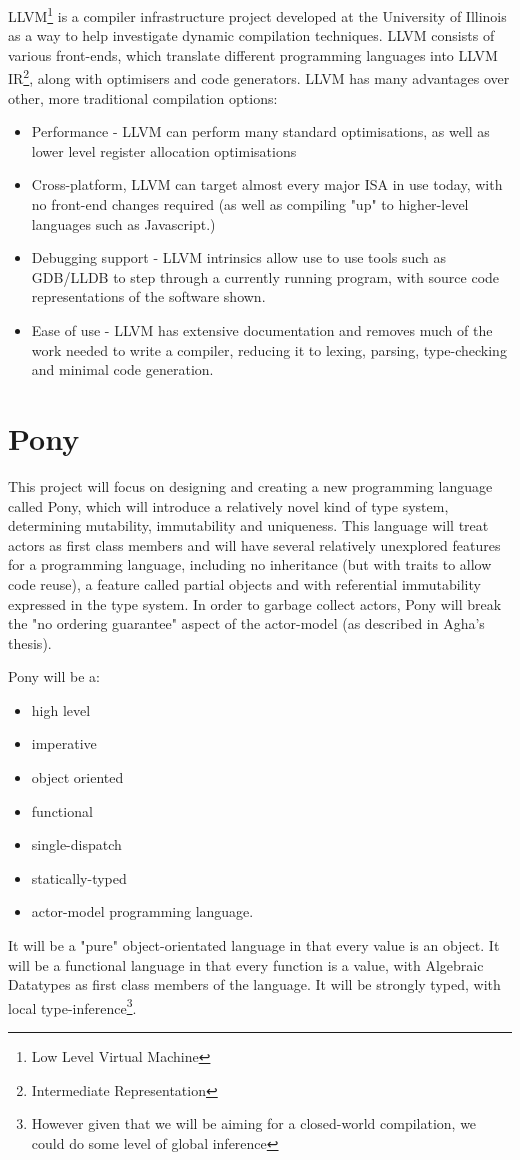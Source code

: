 \documentclass[pdftex,12pt,a4paper]{article}
\begin{document}
LLVM\footnote{Low Level Virtual Machine} is a compiler infrastructure project developed at the University of Illinois as a way to help investigate dynamic compilation techniques\cite{Lattner:MSThesis02}.
LLVM consists of various front-ends, which translate different programming languages into LLVM IR\footnote{Intermediate Representation}, along with optimisers and code generators.
LLVM has many advantages over other, more traditional compilation options:
\begin{itemize}[noitemsep]
\item Performance - LLVM can perform many standard optimisations, as well as lower level register allocation optimisations
\item Cross-platform, LLVM can target almost every major ISA in use today\cite{llvm-svn}, with no front-end changes required (as well as compiling "up" to higher-level languages such as Javascript.) 
\item Debugging support - LLVM intrinsics allow use to use tools such as GDB/LLDB to step through a currently running program, with source code representations of the software shown.
\item Ease of use - LLVM has extensive documentation and removes much of the work needed to write a compiler, reducing it to lexing, parsing, type-checking and minimal code generation.
\end{itemize}

\newpage
\section{Pony}

This project will focus on designing and creating a new programming language called Pony, which will introduce a relatively novel kind of type system, determining mutability, immutability and uniqueness.
This language will treat actors as first class members and will have several relatively unexplored features for a programming language, including no inheritance (but with traits to allow code reuse), a feature called partial objects and with referential immutability expressed in the type system. 
In order to garbage collect actors, Pony will break the "no ordering guarantee" aspect of the actor-model (as described in Agha's thesis\cite{agha1985}).

Pony will be a:
\begin{itemize}[noitemsep]
\item high level
\item imperative
\item object oriented
\item functional
\item single-dispatch
\item statically-typed
\item actor-model programming language.
\end{itemize}
It will be a "pure" object-orientated language in that every value is an object.
It will be a functional language in that every function is a value, with Algebraic Datatypes as first class members of the language.
It will be strongly typed, with local type-inference\footnote{However given that we will be aiming for a closed-world compilation, we could do some level of global inference}.
\end{document}
